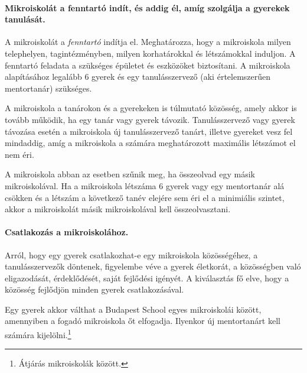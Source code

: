 \paragraph{Mikroiskolát a fenntartó indít, és addig él, amíg szolgálja a gyerekek tanulását.}
A mikroiskolát a \emph{fenntartó} indítja el. Meghatározza, hogy a mikroiskola milyen telephelyen, tagintézményben, milyen korhatárokkal és létszámokkal induljon. A fenntartó feladata a szükséges épületet és eszközöket biztosítani. A mikroiskola alapításához legalább 6 gyerek és egy tanulásszervező (aki értelemszerűen mentortanár) szükséges.

A mikroiskola a tanárokon és a gyerekeken is túlmutató közösség, amely akkor is tovább működik, ha egy tanár vagy gyerek távozik. Tanulásszervező vagy gyerek távozása esetén a mikroiskola  új tanulásszervező tanárt, illetve gyereket vesz fel mindaddig, amíg a mikroiskola a számára meghatározott maximális létszámot el nem éri.

A mikroiskola abban az esetben szűnik meg, ha összeolvad egy másik mikroiskolával. Ha a mikroiskola létszáma 6 gyerek vagy egy mentortanár alá csökken és a létszám a következő tanév elejére sem éri el a minimiális szintet, akkor a mikroiskolát másik mikroiskolával kell összeolvasztani.

\paragraph{Csatlakozás a mikroiskolához.}
Arról, hogy egy gyerek csatlakozhat-e egy mikroiskola közösségéhez, a tanulásszervezők döntenek, figyelembe véve a gyerek életkorát, a közösségben való eligazodását, érdeklődését, saját fejlődési igényét. A kiválasztás fő elve,  hogy a közösség fejlődjön minden gyerek csatlakozásával.

Egy gyerek akkor válthat a Budapest School egyes mikroiskolái között, amennyiben a fogadó mikroiskola őt elfogadja. Ilyenkor új mentortanárt kell számára kijelölni.\footnote{Átjárás mikroiskolák között.}
